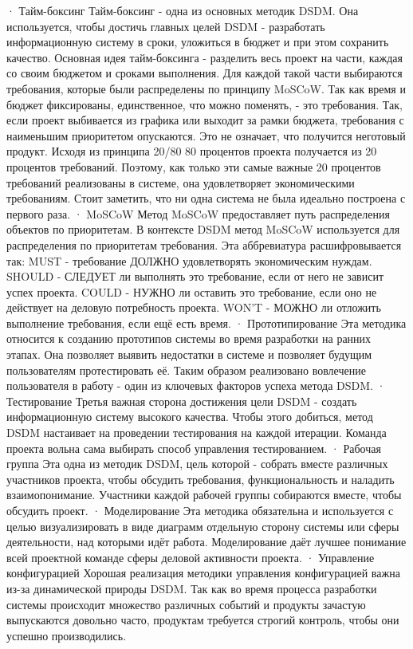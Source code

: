 \documentclass{../industrial-development}
\begin{document}
\lecturenotes
· Тайм-боксинг 
Тайм-боксинг - одна из основных методик DSDM. Она используется, чтобы достичь главных целей DSDM - разработать информационную систему в сроки, уложиться в бюджет и при этом сохранить качество. Основная идея тайм-боксинга - разделить весь проект на части, каждая со своим бюджетом и сроками выполнения. Для каждой такой части выбираются требования, которые были распределены по принципу MoSCoW. Так как время и бюджет фиксированы, единственное, что можно поменять, - это требования. Так, если проект выбивается из графика или выходит за рамки бюджета, требования с наименьшим приоритетом опускаются. Это не означает, что получится неготовый продукт. Исходя из принципа 20/80 80 процентов проекта получается из 20 процентов требований. Поэтому, как только эти самые важные 20 процентов требований реализованы в системе, она удовлетворяет экономическими требованиям. Стоит заметить, что ни одна система не была идеально построена с первого раза. 
· MoSCoW 
Метод MoSCoW предоставляет путь распределения объектов по приоритетам. В контексте DSDM метод MoSCoW используется для распределения по приоритетам требования. Эта аббревиатура расшифровывается так: 
MUST - требование ДОЛЖНО удовлетворять экономическим нуждам. 
SHOULD - СЛЕДУЕТ ли выполнять это требование, если от него не зависит успех проекта. 
COULD - НУЖНО ли оставить это требование, если оно не действует на деловую потребность проекта. 
WON'T - МОЖНО ли отложить выполнение требования, если ещё есть время. 
· Прототипирование 
Эта методика относится к созданию прототипов системы во время разработки на ранних этапах. Она позволяет выявить недостатки в системе и позволяет будущим пользователям протестировать её. Таким образом реализовано вовлечение пользователя в работу - один из ключевых факторов успеха метода DSDM. 
· Тестирование 
Третья важная сторона достижения цели DSDM - создать информационную систему высокого качества. Чтобы этого добиться, метод DSDM настаивает на проведении тестирования на каждой итерации. Команда проекта вольна сама выбирать способ управления тестированием. 
· Рабочая группа 
Эта одна из методик DSDM, цель которой - собрать вместе различных участников проекта, чтобы обсудить требования, функциональность и наладить взаимопонимание. Участники каждой рабочей группы собираются вместе, чтобы обсудить проект. 
· Моделирование 
Эта методика обязательна и используется с целью визуализировать в виде диаграмм отдельную сторону системы или сферы деятельности, над которыми идёт работа. Моделирование даёт лучшее понимание всей проектной команде сферы деловой активности проекта. 
· Управление конфигурацией 
Хорошая реализация методики управления конфигурацией важна из-за динамической природы DSDM. Так как во время процесса разработки системы происходит множество различных событий и продукты зачастую выпускаются довольно часто, продуктам требуется строгий контроль, чтобы они успешно производились. 
\end{document}
